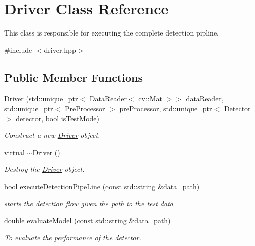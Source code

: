 \hypertarget{classDriver}{}\section{Driver Class Reference}
\label{classDriver}


This class is responsible for executing the complete detection pipline.  




{\ttfamily \#include $<$driver.\+hpp$>$}

\subsection*{Public Member Functions}
\begin{DoxyCompactItemize}
\item 
\hyperlink{classDriver_a00a14ae9c9847d0012185e6ca34dde98}{Driver} (std\+::unique\+\_\+ptr$<$ \hyperlink{classDataReader}{Data\+Reader}$<$ cv\+::\+Mat $>$$>$ data\+Reader, std\+::unique\+\_\+ptr$<$ \hyperlink{classPreProcessor}{Pre\+Processor} $>$ pre\+Processor, std\+::unique\+\_\+ptr$<$ \hyperlink{classDetector}{Detector} $>$ detector, bool is\+Test\+Mode)
\begin{DoxyCompactList}\small\item\em Construct a new \hyperlink{classDriver}{Driver} object. \end{DoxyCompactList}\item 
\mbox{\label{classDriver_ac7645eea8d3ce2bc39ddbda5e840297a}} 
virtual \hyperlink{classDriver_ac7645eea8d3ce2bc39ddbda5e840297a}{$\sim$\+Driver} ()
\begin{DoxyCompactList}\small\item\em Destroy the \hyperlink{classDriver}{Driver} object. \end{DoxyCompactList}\item 
bool \hyperlink{classDriver_ae57ca27b933b3522aca744205a8a2169}{execute\+Detection\+Pipe\+Line} (const std\+::string \&data\+\_\+path)
\begin{DoxyCompactList}\small\item\em starts the detection flow given the path to the test data \end{DoxyCompactList}\item 
double \hyperlink{classDriver_ac148a08a64a167ec6c301e7e90fcdd3e}{evaluate\+Model} (const std\+::string \&data\+\_\+path)
\begin{DoxyCompactList}\small\item\em To evaluate the performance of the detector. \end{DoxyCompactList}\end{DoxyCompactItemize}


